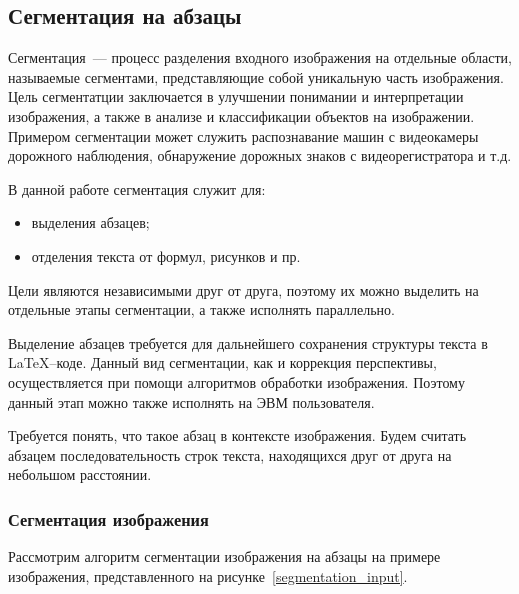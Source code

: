 \subsection{Сегментация на абзацы}

Сегментация~--- процесс разделения входного изображения на отдельные области, называемые сегментами, представляющие собой уникальную часть изображения. Цель сегментатции заключается в улучшении понимании и интерпретации изображения, а также в анализе и классификации объектов на изображении.
Примером сегментации может служить распознавание машин с видеокамеры дорожного наблюдения, обнаружение дорожных знаков с видеорегистратора и т.д.

В данной работе сегментация служит для:
\begin{itemize}
    \item выделения абзацев;
    \item отделения текста от формул, рисунков и пр.
\end{itemize}

Цели являются независимыми друг от друга, поэтому их можно выделить на отдельные этапы сегментации, а также исполнять параллельно. 

Выделение абзацев требуется для дальнейшего сохранения структуры текста в \LaTeX--коде. Данный вид сегментации, как и коррекция перспективы, осуществляется при помощи алгоритмов обработки изображения.
Поэтому данный этап можно также исполнять на ЭВМ пользователя.

Требуется понять, что такое абзац в контексте изображения. Будем считать абзацем последовательность строк текста, находящихся друг от друга на небольшом расстоянии.

\subsubsection{Сегментация изображения}

Рассмотрим алгоритм сегментации изображения на абзацы на примере изображения, представленного на рисунке~\ref{segmentation_input}.

